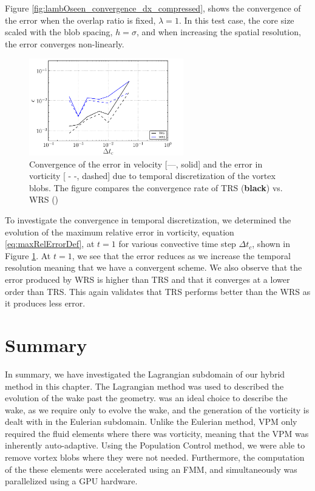 Figure \ref{fig:lambOseen_convergence_dx_compressed}, shows the convergence of the error when the overlap ratio is fixed, $\lambda = 1$. In this test case, the core size scaled with the blob spacing, $h=\sigma$, and when increasing the spatial resolution, the error converges non-linearly.
	
	\begin{figure}[!b]
	\centering
	\includegraphics[width=0.6\textwidth]{figures/lagrangian/lambOseen_dtConvergence_WRSvsTRS.pdf}
	\caption{Convergence of the error in velocity [---, solid] and the error in vorticity [ - -, dashed] due to temporal discretization of the vortex blobs. The figure compares the convergence rate of TRS (\textbf{black}) vs. WRS ({})}
	\label{fig:lambOseen_dtConvergence_WRSvsTRS}
	\end{figure}		
	
	
To investigate the convergence in temporal discretization, we determined the evolution of the maximum relative error in vorticity, equation \ref{eq:maxRelErrorDef}, at $t=1$ for various convective time step $\Delta t_c$, shown in Figure \ref{fig:lambOseen_dtConvergence_WRSvsTRS}. At $t=1$, we see that the error reduces as we increase the temporal resolution meaning that we have a convergent scheme. We also observe that the error produced by WRS is higher than TRS and that it converges at a lower order than TRS. This again validates that TRS performs better than the WRS as it produces less error.




\section{Summary}

In summary, we have investigated the Lagrangian subdomain of our hybrid method in this chapter. The Lagrangian method was used to described the evolution of the wake past the geometry.  was an ideal choice to describe the wake, as we require only to evolve the wake, and the generation of the vorticity is dealt with in the Eulerian subdomain. Unlike the Eulerian method, VPM only required the fluid elements where there was vorticity, meaning that the VPM was inherently auto-adaptive. Using the Population Control method, we were able to remove vortex blobs where they were not needed. Furthermore, the computation of the these elements were accelerated using an FMM, and simultaneously was parallelized using a GPU hardware. 

